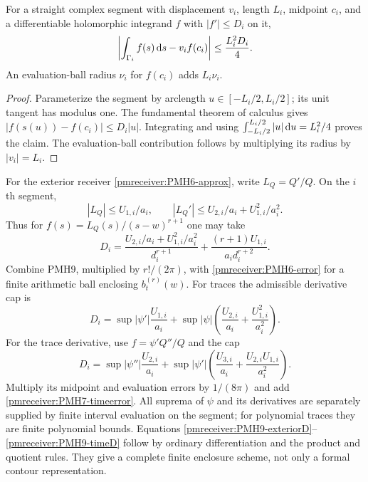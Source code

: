 \documentclass[11pt]{article}
\begin{document}
\begin{pmreceiverlemma}
\label{pmreceiver:PMH9}
For a straight complex segment with displacement $v_i$, length
$L_i$, midpoint $c_i$, and a differentiable holomorphic integrand
$f$ with $|f'|\le D_i$ on it,
\begin{equation}\label{pmreceiver:PMH9-midpoint}
 \left|\int_{\Gamma_i}f(s)\,\mathrm d s-v_if(c_i)\right|
 \le\frac{L_i^2D_i}{4}.
\end{equation}
An evaluation-ball radius $\nu_i$ for $f(c_i)$ adds $L_i\nu_i$.
\end{pmreceiverlemma}
\begin{proof}
Parameterize the segment by arclength $u\in[-L_i/2,L_i/2]$;
its unit tangent has modulus one. The fundamental theorem of
calculus gives $|f(s(u))-f(c_i)|\le D_i|u|$.
Integrating and using
$\int_{-L_i/2}^{L_i/2}|u|\,\mathrm d u=L_i^2/4$ proves the claim.
The evaluation-ball contribution follows by multiplying its radius
by $|v_i|=L_i$.
\end{proof}

For the exterior receiver \eqref{pmreceiver:PMH6-approx}, write
$L_Q=Q'/Q$. On the $i$th segment,
\[
 |L_Q|\le U_{1,i}/a_i,\qquad
 |L_Q'|\le U_{2,i}/a_i+U_{1,i}^2/a_i^2.
\]
Thus for $f(s)=L_Q(s)/(s-w)^{r+1}$ one may take
\begin{equation}\label{pmreceiver:PMH9-exteriorD}
 D_i=\frac{U_{2,i}/a_i+U_{1,i}^2/a_i^2}{d_i^{r+1}}
       +\frac{(r+1)U_{1,i}}{a_i d_i^{r+2}}.
\end{equation}
Combine PMH9, multiplied by $r!/(2\pi)$, with
\eqref{pmreceiver:PMH6-error} for a finite arithmetic ball enclosing
$b_t^{(r)}(w)$. For traces the admissible derivative cap is
\begin{equation}\label{pmreceiver:PMH9-traceD}
 D_i=\sup|\psi'|\frac{U_{1,i}}{a_i}
 +\sup|\psi|\left(\frac{U_{2,i}}{a_i}
                         +\frac{U_{1,i}^2}{a_i^2}\right).
\end{equation}
For the trace derivative, use $f=\psi'Q''/Q$ and the cap
\begin{equation}\label{pmreceiver:PMH9-timeD}
 D_i=\sup|\psi''|\frac{U_{2,i}}{a_i}
 +\sup|\psi'|\left(\frac{U_{3,i}}{a_i}
                         +\frac{U_{2,i}U_{1,i}}{a_i^2}\right).
\end{equation}
Multiply its midpoint and evaluation errors by $1/(8\pi)$ and add
\eqref{pmreceiver:PMH7-timeerror}. All suprema of $\psi$ and its derivatives
are separately supplied by finite interval evaluation on the
segment; for polynomial traces they are finite polynomial bounds.
Equations \eqref{pmreceiver:PMH9-exteriorD}--\eqref{pmreceiver:PMH9-timeD} follow by
ordinary differentiation and the product and quotient rules. They
give a complete finite enclosure scheme, not only a formal contour
representation.
\end{document}
